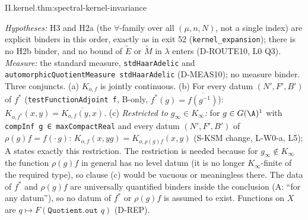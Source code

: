 \begin{tfformal}{II.kernel.thm:spectral-kernel-invariance}
\begin{tffidelity}
\emph{Hypotheses:} H3 and H2a (the $\forall$-family over all $(\mu,n,N)$, not a single index) are explicit binders in this order, exactly as in exit 52 (\texttt{kernel\_expansion}); there is no H2b binder, and no bound of $\widetilde E$ or $\widetilde M$ in $\lambda$ enters (D-ROUTE10, L0 Q3). \emph{Measure:} the standard measure, \texttt{stdHaarAdelic} and \texttt{automorphicQuotientMeasure stdHaarAdelic} (D-MEAS10); no measure binder. Three conjuncts. (a) $K_{o,f}$ is jointly continuous. (b) For every datum $(N',F',B')$ of $f^*$ (\texttt{testFunctionAdjoint f}, B-only, $f^*(g)=\overline{f(g^{-1})}$): $K_{o,f^*}(x,y)=\overline{K_{o,f}(y,x)}$. (c) \emph{Restricted to $g_\infty\in K_\infty$:} for $g\in G(\A)^1$ with \texttt{compInf g ∈ maxCompactReal} and every datum $(N',F',B')$ of $\rho(g)f=f(\cdot\,g)$: $K_{o,f}(x,yg)=K_{o,\rho(g)f}(x,y)$ (S-KSM change, L-W0-a, L5); A states exactly this restriction. The restriction is needed because for $g_\infty\notin K_\infty$ the function $\rho(g)f$ in general has no level datum (it is no longer $K_\infty$-finite of the required type), so clause (c) would be vacuous or meaningless there. The data of $f^*$ and $\rho(g)f$ are universally quantified binders inside the conclusion (A: ``for any datum''), so no datum of $f^*$ or $\rho(g)f$ is assumed to exist. Functions on $X$ are $q\mapsto F(\texttt{Quotient.out }q)$ (D-REP). 
\end{tffidelity}
\end{tfformal}

